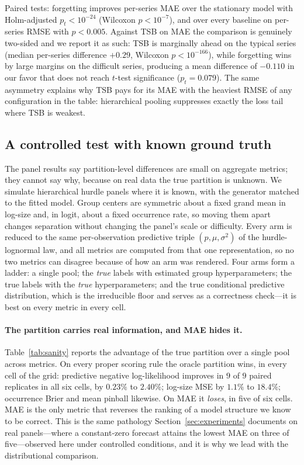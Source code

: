 \documentclass[twocolumn,10pt]{article}
\begin{document}
Paired tests: forgetting improves per-series
MAE over the stationary model with Holm-adjusted $p_t<10^{-24}$
(Wilcoxon $p<10^{-7}$), and over every baseline on per-series RMSE with
$p<0.005$. Against TSB on MAE the comparison is genuinely two-sided and we report
it as such: TSB is marginally ahead on the typical series (median
per-series difference $+0.29$, Wilcoxon $p<10^{-166}$), while forgetting
wins by large margins on the difficult series, producing a mean
difference of $-0.110$ in our favor that does not reach $t$-test
significance ($p_t=0.079$). The same asymmetry explains why TSB pays for
its MAE with the heaviest RMSE of any configuration in the table:
hierarchical pooling suppresses exactly the loss tail where TSB is
weakest.

\subsection{A controlled test with known ground truth}\label{sec:synthetic}

The panel results say partition-level differences are small on aggregate
metrics; they cannot say why, because on real data the true partition is
unknown. We simulate hierarchical hurdle panels where it is known, with
the generator matched to the fitted model. Group centers are symmetric
about a fixed grand mean in log-size and, in logit, about a fixed
occurrence rate, so moving them apart changes separation without changing
the panel's scale or difficulty. Every arm is reduced to the same
per-observation predictive triple $(p,\mu,\sigma^2)$ of the
hurdle-lognormal law, and all metrics are computed from that one
representation, so no two metrics can disagree because of how an arm was
rendered. Four arms form a ladder: a single pool; the \emph{true} labels
with estimated group hyperparameters; the true labels with the
\emph{true} hyperparameters; and the true conditional predictive
distribution, which is the irreducible floor and serves as a correctness
check---it is best on every metric in every cell.

\paragraph{The partition carries real information, and MAE hides it.}
Table~\ref{tab:sanity} reports the advantage of the true partition over a
single pool across metrics. On every proper scoring rule the oracle
partition wins, in every cell of the grid: predictive negative
log-likelihood improves in $9$ of $9$ paired replicates in all six
cells, by $0.23\%$ to $2.40\%$; log-size MSE by $1.1\%$ to $18.4\%$;
occurrence Brier and mean pinball likewise. On MAE it \emph{loses}, in
five of six cells. MAE is the only metric that reverses the ranking of a
model structure we know to be correct. This is the same pathology
Section~\ref{sec:experiments} documents on real panels---where a constant-zero
forecast attains the lowest MAE on three of five---observed here under
controlled conditions, and it is why we lead with the distributional
comparison.
\end{document}
